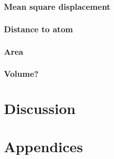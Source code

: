 \documentclass[twoside,english,a4paper]{uiofysmaster}
\begin{document}
    \section{Mean square displacement}
    \section{Distance to atom}
    \section{Area}
    \section{Volume?}

\part{Discussion}

\part{Appendices}

\printbibliography
% 
\end{document}
